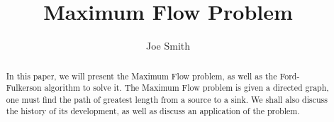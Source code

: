 \documentclass[10pt]{article}
\begin{document}
\title{Maximum Flow Problem}
\author{Joe Smith}

\maketitle

\begin{abstract}
In this paper, we will present the Maximum Flow problem, as well as the Ford-Fulkerson algorithm to solve it. The Maximum Flow problem is given a directed graph, one must find the path of greatest length from a source to a sink. We shall also discuss the history of its development, as well as discuss an application of the problem.
\end{abstract}
\end{document}
